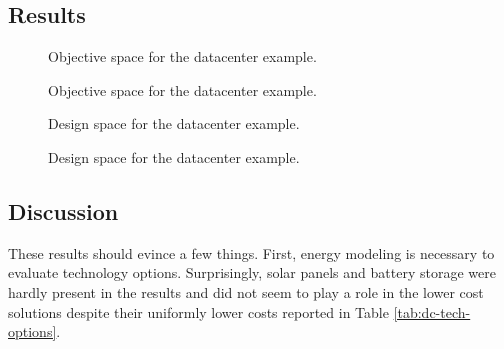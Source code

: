 \subsection{Results}

\begin{figure}[htbp!]
    \centering
    \resizebox{\columnwidth}{!}{}
    \caption{Objective space for the datacenter example.}
    \label{fig:dc_objective_space}
\end{figure}

\begin{figure}[htbp!]
    \centering
    \resizebox{\columnwidth}{!}{}
    \caption{Objective space for the datacenter example.}
    \label{fig:dc_objective_space_10}
\end{figure}

\begin{figure}[htbp!]
    \centering
    \resizebox{\columnwidth}{!}{}
    \caption{Design space for the datacenter example.}
    \label{fig:dc_design_space}
\end{figure}



\begin{figure}[htbp!]
    \centering
    \resizebox{\columnwidth}{!}{}
    \caption{Design space for the datacenter example.}
    \label{fig:dc_design_space_10}
\end{figure}


\subsection{Discussion}

These results should evince a few things. First, energy modeling is necessary to
evaluate technology options. Surprisingly, solar panels and battery storage were
hardly present in the results and did not seem to play a role in the lower cost
solutions despite their uniformly lower costs reported in Table
\ref{tab:dc-tech-options}.
